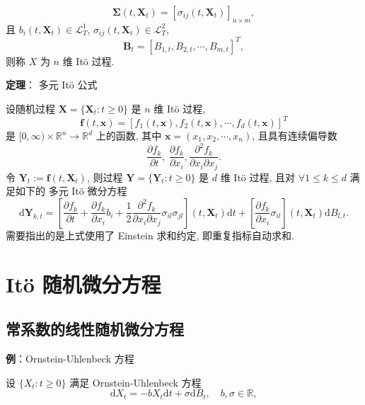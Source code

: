 \documentclass[openany]{ctexbook}
\theoremstyle{kaiti}
\theoremstyle{normal}
\begin{document}
\begin{equation}
  \bm{\Sigma}(t,\bm{X}_t)=[\sigma_{ij}(t,\bm{X}_t)]_{n\times m},
\end{equation}
且 $b_i(t,\bm{X}_t)\in\mathcal{L}_T^1$, $\sigma_{ij}(t,\bm{X}_t)\in\mathcal{L}_T^2$,
\begin{equation}
  \bm{B}_t=\left[B_{1,t},B_{2,t},\cdots,B_{m,t}\right]^T,
\end{equation}
则称 $X$ 为 $n$ 维 It\"o 过程.

\textbf{定理}： 多元 It\"o 公式

设随机过程 $\bm{X}=\{\bm{X}_t:t\geqslant0\}$ 是 $n$ 维 It\"o 过程,
\begin{equation}
  \bm{f}(t,\bm{x})=[f_1(t,\bm{x}),f_2(t,\bm{x}),\cdots,f_d(t,\bm{x})]^T
\end{equation}
是 $[0,\infty)\times\mathbb{R}^n\to\mathbb{R}^d$ 上的函数, 其中 $\bm{x}=(x_1,x_2,\cdots,x_n)$, 且具有连续偏导数
\begin{equation}
  \frac{\partial f_k}{\partial t},~\frac{\partial f_k}{\partial x_i},\frac{\partial^2 f_k}{\partial x_i\partial x_j}.
\end{equation}
令 $\bm{Y}_t:= \bm{f}(t,\bm{X}_t)$, 则过程 $\bm{Y}=\{\bm{Y}_t:t\geqslant0\}$ 是 $d$ 维 It\"o 过程, 且对 $\forall 1\leqslant k\leqslant d$ 满足如下的 多元 It\"o 微分方程
\begin{equation}
  \mathrm{d}\bm{Y}_{k,t}=\left[\frac{\partial f_k}{\partial t}+\frac{\partial f_k}{\partial x_i}b_i+\frac{1}{2}\frac{\partial^2 f_k}{\partial x_i\partial x_j}\sigma_{il}\sigma_{jl}\right](t,\bm{X}_t)\mathrm{d}t+\left[\frac{\partial f_k}{\partial x_i}\sigma_{il}\right](t,\bm{X}_t)\mathrm{d}B_{l,t}.
\end{equation}
需要指出的是上式使用了 Einstein 求和约定, 即重复指标自动求和.

\section{It\"o 随机微分方程}

\subsection{常系数的线性随机微分方程}

\textbf{例}：Ornstein-Uhlenbeck 方程

设 $\{X_t:t\geqslant0\}$ 满足 Ornstein-Uhlenbeck 方程
\begin{equation}
  \mathrm{d}X_t=-b X_t\mathrm{d}t+\sigma\mathrm{d}B_t,\quad b,\sigma\in\mathbb{R},
\end{equation}
\end{document}
